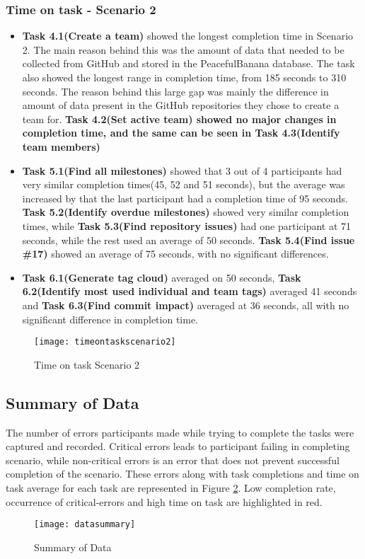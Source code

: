 \subsubsection{Time on task - Scenario 2}
\begin{itemize}
	\item \textbf{Task 4.1(Create a team)} showed the longest completion time in Scenario 2. The main reason behind this was the amount of data that needed to be collected from GitHub and stored in the PeacefulBanana database. The task also showed the longest range in completion time, from 185 seconds to 310 seconds. The reason behind this large gap was mainly the difference in amount of data present in the GitHub repositories they chose to create a team for. \textbf{Task 4.2(Set active team) showed no major changes in completion time, and the same can be seen in \textbf{Task 4.3(Identify team members)}}
	\item \textbf{Task 5.1(Find all milestones)} showed that 3 out of 4 participants had very similar completion times(45, 52 and 51 seconds), but the average was increased by that the last participant had a completion time of 95 seconds. \textbf{Task 5.2(Identify overdue milestones)} showed very similar completion times, while \textbf{Task 5.3(Find repository issues)} had one participant at 71 seconds, while the rest used an average of 50 seconds. \textbf{Task 5.4(Find issue \#17)} showed an average of 75 seconds, with no significant differences. 
	\item \textbf{Task 6.1(Generate tag cloud)} averaged on 50 seconds, \textbf{Task 6.2(Identify most used individual and team tags)} averaged 41 seconds and \textbf{Task 6.3(Find commit impact)} averaged at 36 seconds, all with no significant difference in completion time. 
\end{itemize}
\begin{figure}[h!]
    \centering
        \texttt{[image: timeontaskscenario2]}
    \caption{Time on task Scenario 2}
    \label{timeontaskscenario2}
\end{figure}

\subsection{Summary of Data}
The number of errors participants made while trying to complete the tasks were captured and recorded. Critical errors leads to participant failing in completing scenario, while non-critical errors is an error that does not prevent successful completion of the scenario. These errors along with task completions and time on task average for each task are represented in Figure \ref{datasummary}.
Low completion rate, occurrence of critical-errors and high time on task are highlighted in red. 
\begin{figure}[H]
    \centering
        \texttt{[image: datasummary]}
    \caption{Summary of Data}
    \label{datasummary}
\end{figure}

